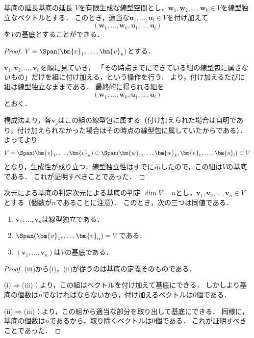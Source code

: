 \begin{theorem}{基底の延長}{基底の延長}
  $V$を有限生成な線型空間とし，$\bm{w}_1, \bm{w}_2, \dots, \bm{w}_k \in V$を線型独立なベクトルとする．
  このとき，適当な$\bm{u}_1, \dots, \bm{u}_l \in V$を付け加えて
  \[
    (\bm{w}_1, \dots, \bm{w}_k, \bm{u}_1, \dots, \bm{u}_l)
  \]
  を$V$の基底とすることができる．
\end{theorem}

\begin{leftbar}
\begin{proof}
  $V = \Span(\bm{v}_1, \dots, \bm{v}_n)$とする．

  $\bm{v}_1, \bm{v}_2, \dots, \bm{v}_n$を順に見ていき，
  「その時点までにできている組の線型包に属さないもの」だけを組に付け加える，という操作を行う．
  より，付け加えるたびに組は線型独立なままである．
  最終的に得られる組を
  \[
    (\bm{w}_1, \dots, \bm{w}_k, \bm{u}_1, \dots, \bm{u}_l)
  \]
  とおく．

  構成法より，各$\bm{v}_j$はこの組の線型包に属する（付け加えられた場合は自明であり，付け加えられなかった場合はその時点の線型包に属していたからである）．
  よってより
  \[
    V = \Span(\bm{v}_1, \dots, \bm{v}_n)
    \subset \Span(\bm{w}_1, \dots, \bm{w}_k, \bm{u}_1, \dots, \bm{u}_l)
    \subset V
  \]
  となり，生成性が成り立つ．線型独立性はすでに示したので，この組は$V$の基底である．
  これが証明すべきことであった．
\end{proof}
\end{leftbar}

\begin{cor}{次元による基底の判定}{次元による基底の判定}
  $\dim V = n$とし，$\bm{v}_1, \bm{v}_2, \dots, \bm{v}_n \in V$とする（個数が$n$であることに注意）．
  このとき，次の三つは同値である．
  \begin{enumerate}[label=(\roman*),leftmargin=3.2em]
    \item $\bm{v}_1, \dots, \bm{v}_n$は線型独立である．
    \item $\Span(\bm{v}_1, \dots, \bm{v}_n) = V$である．
    \item $(\bm{v}_1, \dots, \bm{v}_n)$は$V$の基底である．
  \end{enumerate}
\end{cor}

\begin{leftbar}
\begin{proof}
  (iii)から(i)，(ii)が従うのは基底の定義そのものである．

  (i)$\Rightarrow$(iii)：より，この組はベクトルを付け加えて基底にできる．
  しかしより基底の個数は$n$でなければならないから，付け加えるベクトルは$0$個である．

  (ii)$\Rightarrow$(iii)：より，この組から適当な部分を取り出して基底にできる．
  同様に，基底の個数は$n$であるから，取り除くベクトルは$0$個である．
  これが証明すべきことであった．
\end{proof}
\end{leftbar}

